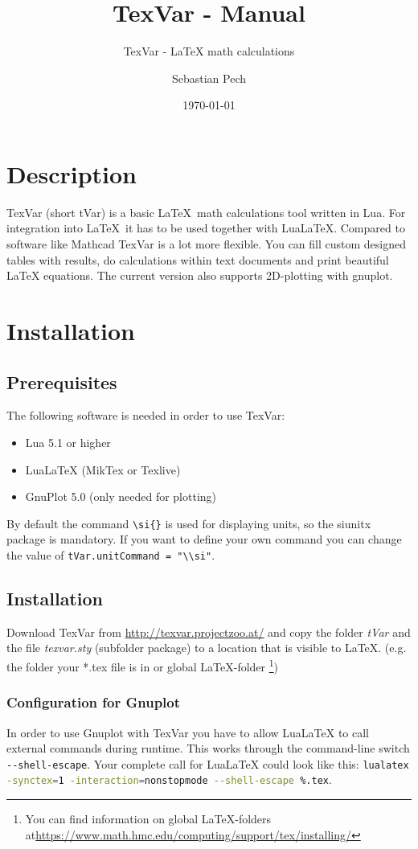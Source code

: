 \documentclass[fleqn]{mybase}
\title{TexVar - Manual}
\subtitle{TexVar - LaTeX math calculations\\[0.5 cm]\normalsize\directlua{tVar.getVersion()}}
\date{\today}
\author{Sebastian Pech}
\begin{document}
\maketitle
\tableofcontents
\section{Description}
TexVar (short tVar) is a basic \LaTeX~math calculations tool written in Lua. For integration into \LaTeX~it has to be used together with LuaLaTeX. Compared to software like Mathcad TexVar is a lot more flexible. You can fill custom designed tables with results, do calculations within text documents and print beautiful LaTeX equations. The current version also supports 2D-plotting with gnuplot.
\section{Installation}
\subsection{Prerequisites}
The following software is needed in order to use TexVar:
\begin{itemize}
	\item Lua 5.1 or higher
	\item LuaLaTeX (MikTex or Texlive)
	\item GnuPlot 5.0 (only needed for plotting)
\end{itemize}
By default the command \verb|\si{}| is used for displaying units, so the siunitx package is mandatory. If you want to define your own command you can change the value of \verb|tVar.unitCommand = "\\si"|. 
\subsection{Installation}
Download TexVar from \url{http://texvar.projectzoo.at/} and copy the folder \emph{tVar} and the file \emph{texvar.sty} (subfolder package) to a location that is visible to \LaTeX. (e.g. the folder your *.tex file is in or global \LaTeX-folder \footnote{You can find information on global \LaTeX-folders at\url{https://www.math.hmc.edu/computing/support/tex/installing/}})
\subsubsection{Configuration for Gnuplot}
In order to use Gnuplot with TexVar you have to allow LuaLaTeX to call external commands during runtime. This works through the command-line switch \lstinline[language=Bash]|--shell-escape|. Your complete call for LuaLaTeX could look like this: \lstinline[language=Bash]|lualatex -synctex=1 -interaction=nonstopmode --shell-escape %.tex|. 
\end{document}
